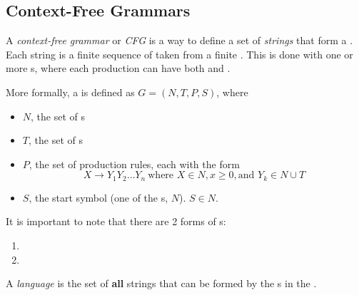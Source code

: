\subsection{Context-Free Grammars}\label{subsec:Context_Free_Grammars}
\begin{definition}\label{def:Context_Free_Grammar}
  A \emph{context-free grammar} or \emph{CFG} is a way to define a set of \textit{strings} that form a .
  Each string is a finite sequence of  taken from a finite .
  This is done with one or more s, where each production can have both  and .

  More formally, a  is defined as $G = (N, T, P, S)$, where
  \begin{itemize}[noitemsep]
  \item $N$, the set of s
  \item $T$, the set of s
  \item $P$, the set of production rules, each with the form
    \begin{equation*}
      X \rightarrow Y_{1} Y_{2} \ldots Y_{n} \: \text{where } X \in N, x \geq 0, \text{and } Y_{k} \in N \cup T
    \end{equation*}
  \item $S$, the start symbol (one of the s, $N$). $S \in N$.
  \end{itemize}

  \begin{remark}
    It is important to note that there are 2 forms of s:
    \begin{enumerate}[noitemsep]
    \item {}
    \item {}
    \end{enumerate}
  \end{remark}
\end{definition}

\begin{definition}[Language]\label{def:Language}
  A \emph{language} is the set of \textbf{\textup{all}} strings that can be formed by the s in the .
\end{definition}

